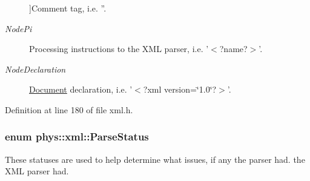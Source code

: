 \begin{Desc}
\begin{description}
{}]Comment tag, i.e. ''. \item[{\em 
\hypertarget{namespacephys_1_1xml_a668b0cc666a9d49f7c7222a7552115d3a3c09d11be0cea840f23f55e084cf72fa}{
NodePi}
\label{d9/d27/namespacephys_1_1xml_a668b0cc666a9d49f7c7222a7552115d3a3c09d11be0cea840f23f55e084cf72fa}
}]Processing instructions to the XML parser, i.e. '$<$?name?$>$'. \item[{\em 
\hypertarget{namespacephys_1_1xml_a668b0cc666a9d49f7c7222a7552115d3a1e3789aa995b7bf563ca8c43553ac035}{
NodeDeclaration}
\label{d9/d27/namespacephys_1_1xml_a668b0cc666a9d49f7c7222a7552115d3a1e3789aa995b7bf563ca8c43553ac035}
}]\hyperlink{classphys_1_1xml_1_1Document}{Document} declaration, i.e. '$<$?xml version=\char`\"{}1.0\char`\"{}?$>$'. \end{description}
\end{Desc}



Definition at line 180 of file xml.h.

\hypertarget{namespacephys_1_1xml_ae7aabb879b21c73d8183a54470f8917f}{
\subsubsection[{ParseStatus}]{\setlength{\rightskip}{0pt plus 5cm}enum {\bf phys::xml::ParseStatus}}}
\label{d9/d27/namespacephys_1_1xml_ae7aabb879b21c73d8183a54470f8917f}


These statuses are used to help determine what issues, if any the parser had. the XML parser had. 

